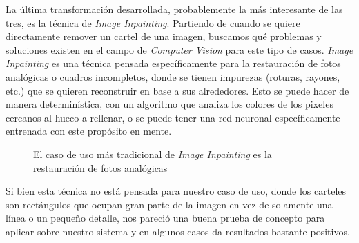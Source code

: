 \documentclass[a4paper]{article}
\begin{document}
La última transformación desarrollada, probablemente la más interesante de las tres, es la técnica de \textit{Image Inpainting}. Partiendo de cuando se quiere directamente remover un cartel de una imagen, buscamos qué problemas y soluciones existen en el campo de \textit{Computer Vision} para este tipo de casos. \textit{Image Inpainting} es una técnica pensada específicamente para la restauración de fotos analógicas o cuadros incompletos, donde se tienen impurezas (roturas, rayones, etc.) que se quieren reconstruir en base a sus alrededores. Esto se puede hacer de manera determinística, con un algoritmo que analiza los colores de los pixeles cercanos al hueco a rellenar, o se puede tener una red neuronal específicamente entrenada con este propósito en mente.

\begin{figure}[H]
\caption{El caso de uso más tradicional de \textit{Image Inpainting} es la restauración de fotos analógicas}
\end{figure}

Si bien esta técnica no está pensada para nuestro caso de uso, donde los carteles son rectángulos que ocupan gran parte de la imagen en vez de solamente una línea o un pequeño detalle, nos pareció una buena prueba de concepto para aplicar sobre nuestro sistema y en algunos casos da resultados bastante positivos.
\end{document}
